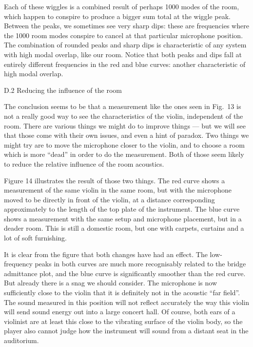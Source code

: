   Each of these wiggles is a combined result of perhaps 1000 modes of the room, 
  which happen to conspire to produce a bigger sum total at the wiggle peak. 
  Between the peaks, we sometimes see very sharp dips: these are frequencies 
  where the 1000 room modes conspire to cancel at that particular microphone 
  position. The combination of rounded peaks and sharp dips is characteristic 
  of any system with high modal overlap, like our room. Notice that both peaks 
  and dips fall at entirely different frequencies in the red and blue curves: 
  another characteristic of high modal overlap. 

  D.2 Reducing the influence of the room 

  The conclusion seems to be that a measurement like the ones seen in Fig.\ 13 
  is not a really good way to see the characteristics of the violin, 
  independent of the room. There are various things we might do to improve 
  things — but we will see that those come with their own issues, and even a 
  hint of paradox. Two things we might try are to move the microphone closer to 
  the violin, and to choose a room which is more “dead” in order to do the 
  measurement. Both of those seem likely to reduce the relative influence of 
  the room acoustics. 

  Figure 14 illustrates the result of those two things. The red curve shows a 
  measurement of the same violin in the same room, but with the microphone 
  moved to be directly in front of the violin, at a distance corresponding 
  approximately to the length of the top plate of the instrument. The blue 
  curve shows a measurement with the same setup and microphone placement, but 
  in a deader room. This is still a domestic room, but one with carpets, 
  curtains and a lot of soft furnishing. 


  It is clear from the figure that both changes have had an effect. The 
  low-frequency peaks in both curves are much more recognisably related to the 
  bridge admittance plot, and the blue curve is significantly smoother than the 
  red curve. But already there is a snag we should consider. The microphone is 
  now sufficiently close to the violin that it is definitely not in the 
  acoustic “far field”. The sound measured in this position will not reflect 
  accurately the way this violin will send sound energy out into a large 
  concert hall. Of course, both ears of a violinist are at least this close to 
  the vibrating surface of the violin body, so the player also cannot judge how 
  the instrument will sound from a distant seat in the auditorium. 

